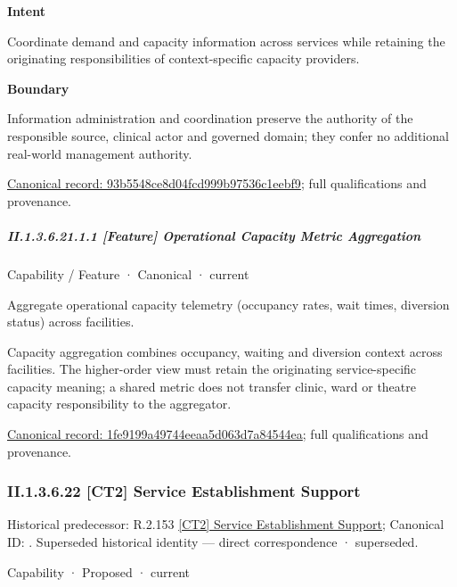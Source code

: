 \textbf{Intent}



Coordinate demand and capacity information across services while retaining the originating responsibilities of context-specific capacity providers.



\textbf{Boundary}



Information administration and coordination preserve the authority of the responsible source, clinical actor and governed domain; they confer no additional real-world management authority.


{\footnotesize \href{../../../../continuum/strategy/capability/93b5548ce8d04fcd999b97536c1eebf9.md}{Canonical record: 93b5548ce8d04fcd999b97536c1eebf9}; full qualifications and provenance.}\par
\subparagraph*{II.1.3.6.21.1.1 [Feature] Operational Capacity Metric Aggregation}
\label{navigation:II.1.3.6.21.1.1}

\label{element:1fe9199a49744eeaa5d063d7a84544ea}
{\small Capability / Feature · Canonical · current}\par

Aggregate operational capacity telemetry (occupancy rates, wait times, diversion status) across facilities.



Capacity aggregation combines occupancy, waiting and diversion context across facilities. The higher-order view must retain the originating service-specific capacity meaning; a shared metric does not transfer clinic, ward or theatre capacity responsibility to the aggregator.


{\footnotesize \href{../../../../continuum/strategy/capability/feature/1fe9199a49744eeaa5d063d7a84544ea.md}{Canonical record: 1fe9199a49744eeaa5d063d7a84544ea}; full qualifications and provenance.}\par
\subsubsection*{II.1.3.6.22 [CT2] Service Establishment Support}
\label{navigation:II.1.3.6.22}

{\small Historical predecessor: R.2.153 \hyperref[element:8a63b08f34fa42c5bda2a3e12b9ecd55]{[CT2] Service Establishment Support}; Canonical ID: \texttt{}. Superseded historical identity — direct correspondence · superseded.}\par
\label{element:20e67a41e7f44398b0f0cf3d379d8b9c}
{\small Capability · Proposed · current}\par

